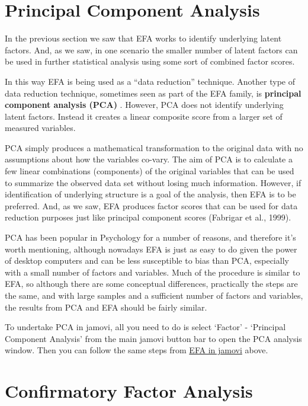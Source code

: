 \documentclass[
  a4paper,
]{book}
\begin{document}
\hypertarget{principal-component-analysis}{%
\section{Principal Component
Analysis}\label{principal-component-analysis}}

In the previous section we saw that EFA works to identify underlying
latent factors. And, as we saw, in one scenario the smaller number of
latent factors can be used in further statistical analysis using some
sort of combined factor scores.

In this way EFA is being used as a ``data reduction'' technique. Another
type of data reduction technique, sometimes seen as part of the EFA
family, is \textbf{principal component analysis (PCA)} . However, PCA
does not identify underlying latent factors. Instead it creates a linear
composite score from a larger set of measured variables.

PCA simply produces a mathematical transformation to the original data
with no assumptions about how the variables co-vary. The aim of PCA is
to calculate a few linear combinations (components) of the original
variables that can be used to summarize the observed data set without
losing much information. However, if identification of underlying
structure is a goal of the analysis, then EFA is to be preferred. And,
as we saw, EFA produces factor scores that can be used for data
reduction purposes just like principal component scores (Fabrigar et
al., 1999).

PCA has been popular in Psychology for a number of reasons, and
therefore it's worth mentioning, although nowadays EFA is just as easy
to do given the power of desktop computers and can be less susceptible
to bias than PCA, especially with a small number of factors and
variables. Much of the procedure is similar to EFA, so although there
are some conceptual differences, practically the steps are the same, and
with large samples and a sufficient number of factors and variables, the
results from PCA and EFA should be fairly similar.

To undertake PCA in jamovi, all you need to do is select `Factor' -
`Principal Component Analysis' from the main jamovi button bar to open
the PCA analysis window. Then you can follow the same steps from
\protect\hyperlink{efa-in-jamovi}{EFA in jamovi} above.

\hypertarget{confirmatory-factor-analysis}{%
\section{Confirmatory Factor
Analysis}\label{confirmatory-factor-analysis}}
\end{document}
